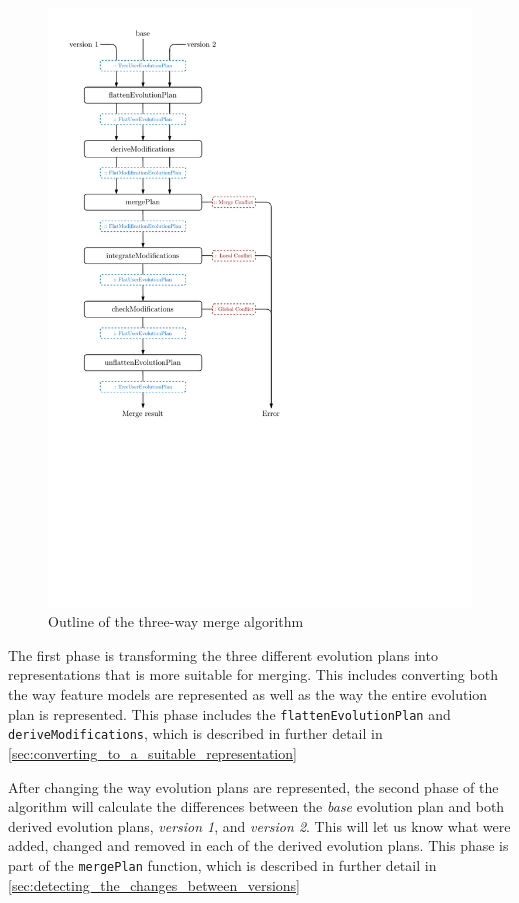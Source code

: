 \documentclass[a4paper,english]{ifimaster}
\begin{document}
\begin{figure}[htbp]
  \centering
  \includegraphics[width=0.8\linewidth]{merge_outline}
  \caption{Outline of the three-way merge algorithm}%
  \label{fig:merge_outline}
\end{figure}

The first phase is transforming the three different evolution plans into representations that is more suitable for merging. This includes converting both the way feature models are represented as well as the way the entire evolution plan is represented. This phase includes the \texttt{flattenEvolutionPlan} and \texttt{deriveModifications}, which is described in further detail in \vref{sec:converting_to_a_suitable_representation}

After changing the way evolution plans are represented, the second phase of the algorithm will calculate the differences between the \textit{base} evolution plan and both derived evolution plans, \textit{version 1}, and \textit{version 2}. This will let us know what were added, changed and removed in each of the derived evolution plans. This phase is part of the \texttt{mergePlan} function, which is described in further detail in \vref{sec:detecting_the_changes_between_versions}
\end{document}
